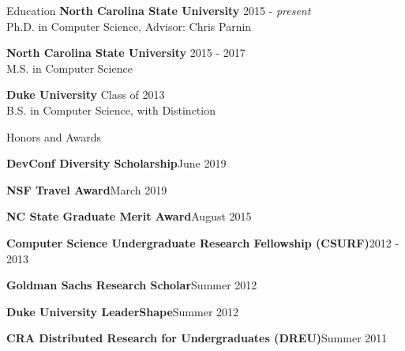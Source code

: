 \documentclass{resume} %
\begin{document}
\vspace{-12pt}
\begin{rSection}{Education}
\vspace{-4pt}
{\bf North Carolina State University} \hfill {2015 - \textit{present}} \\ 
Ph.D. in Computer Science, Advisor: Chris Parnin
\vspace{-7pt}

{\bf North Carolina State University} \hfill {2015 - 2017} \\ 
M.S. in Computer Science
\vspace{-7pt}

{\bf Duke University} \hfill {Class of 2013} \\ 
B.S. in Computer Science, with Distinction
\end{rSection}
\vspace{-12pt}
\begin{rSection}{Honors and Awards}
\vspace{-4pt}

\begin{sSubsection}
    {\textbf{DevConf Diversity Scholarship}}{June 2019}
\end{sSubsection}
\vspace{-7pt}

\begin{sSubsection}
    {\textbf{NSF Travel Award}}{March 2019}
\end{sSubsection}
\vspace{-7pt}

\begin{sSubsection}
    {\textbf{NC State Graduate Merit Award}}{August 2015}
\end{sSubsection}
\vspace{-7pt}

\begin{sSubsection}
    {\textbf{Computer Science Undergraduate Research Fellowship (CSURF)}}{2012 - 2013}
\end{sSubsection}
\vspace{-7pt}

\begin{sSubsection}
    {\textbf{Goldman Sachs Research Scholar}}{Summer 2012}
\end{sSubsection}
\vspace{-7pt}

\begin{sSubsection}
    {\textbf{Duke University LeaderShape}}{Summer 2012}
\end{sSubsection}
\vspace{-7pt}

\begin{sSubsection}
    {\textbf{CRA Distributed Research for Undergraduates (DREU)}}{Summer 2011}
\end{sSubsection}
\end{rSection}
\end{document}
